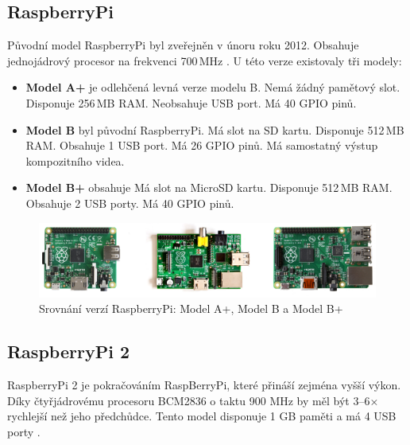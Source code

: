 	\subsection{RaspberryPi}
	Původní model RaspberryPi byl zveřejněn v únoru roku 2012. Obsahuje jednojádrový procesor na frekvenci 700\,MHz \cite{RaspiOne}. U této verze existovaly tři modely:
	
	
	\begin{itemize}
		\item \textbf{Model A+} je odlehčená levná verze modelu B. Nemá žádný pamětový slot. Disponuje 256\,MB RAM. Neobsahuje USB port. Má 40 GPIO pinů.
		\item \textbf{Model B} byl původní RaspberryPi. Má slot na SD kartu. Disponuje 512\,MB RAM. Obsahuje 1 USB port. Má 26 GPIO pinů. Má samostatný výstup kompozitního videa.
		\item \textbf{Model B+} obsahuje   Má slot na MicroSD kartu. Disponuje 512\,MB RAM. Obsahuje 2 USB porty. Má 40 GPIO pinů.
	\end{itemize}
	
	\begin{figure}[!h]
  \begin{center}
    \includegraphics[scale=0.9]{obrazky/embed_raspi_1}
  \end{center}
  \caption{Srovnání verzí RaspberryPi: Model A+, Model B a Model B+ \cite{RaspiOne}}
\end{figure}
	
	\subsection{RaspberryPi 2}
	RaspberryPi 2 je pokračováním RaspBerryPi, které přináší zejména vyšší výkon. Díky čtyřjádrovému procesoru BCM2836 o taktu 900 MHz by měl být 3–6× rychlejší než jeho předchůdce. Tento model disponuje 1 GB paměti a má 4 USB porty \cite{RaspiTwo}.
	

